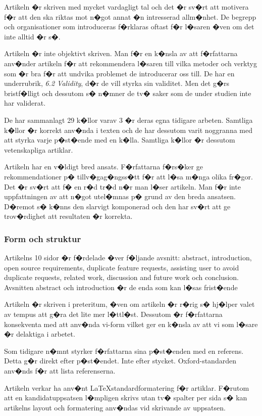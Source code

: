 \documentclass[11pt, oneside]{article}   	%
\begin{document}
Artikeln �r skriven med mycket vardagligt tal och det �r sv�rt att motivera f�r att den ska riktas mot n�got annat �n intresserad allm�nhet. De begrepp och organisationer som introduceras f�rklaras oftast f�r l�saren �ven om det inte alltid �r s�.

Artikeln �r inte objektivt skriven. Man f�r en k�nsla av att f�rfattarna anv�nder artikeln f�r att rekommendera l�saren till vilka metoder och verktyg som �r bra f�r att undvika problemet de introducerar oss till. De har en underrubrik, \emph{6.2 Validity}, d�r de vill styrka sin validitet. Men det g�rs bristf�lligt och dessutom s� n�mner de tv� saker som de under studien inte har validerat.

De har sammanlagt 29 k�llor varav 3 �r deras egna tidigare arbeten. Samtliga k�llor �r korrekt anv�nda i texten och de har dessutom varit noggranna med att styrka varje p�st�ende med en k�lla. Samtliga k�llor �r dessutom vetenskapliga artiklar.

Artikeln har en v�ldigt bred ansats. F�rfattarna f�rs�ker ge rekommendationer p� tillv�gag�ngss�tt f�r att l�sa m�nga olika fr�gor. Det �r sv�rt att f� en r�d tr�d n�r man l�ser artikeln. Man f�r inte uppfattningen av att n�got utel�mnas p� grund av den breda ansatsen. D�remot s� k�nns den slarvigt komponerad och den har sv�rt att ge trov�rdighet att resultaten �r korrekta.

\subsubsection{Form och struktur}
Artikelns 10 sidor �r f�rdelade �ver f�ljande avsnitt: abstract, introduction, open source requirements, duplicate feature requests, assisting user to avoid duplicate requests, related work, discussion and future work och conclusion. Avsnitten abstract och introduction �r de enda som kan l�sas frist�ende

Artikeln �r skriven i preteritum, �ven om artikeln �r r�rig s� hj�lper valet av tempus att g�ra det lite mer l�ttl�st. Dessutom �r f�rfattarna konsekventa med att anv�nda vi-form vilket ger en k�nsla av att vi som l�sare �r delaktiga i arbetet.

Som tidigare n�mnt styrker f�rfattarna sina p�st�enden med en referens. Detta g�r direkt efter p�st�endet. Inte efter stycket. Oxford-standarden anv�nds f�r att lista referenserna.

Artikeln verkar ha anv�nt \LaTeX standardformatering f�r artiklar. F�rutom att en kandidatuppsatsen l�mpligen skrivs utan tv� spalter per sida s� kan artikelns layout och formatering anv�ndas vid skrivande av uppsatsen.
\end{document}
